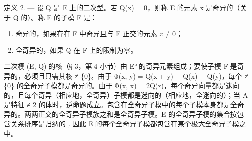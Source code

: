 定义 2. --- 设 Q 是 E 上的二次型。若 Q(x) = 0，则称 E 的元素 x 是奇异的（关于 Q 的）。称 E 的子模 F 是：

\begin{enumerate}
\def\labelenumi{\arabic{enumi})}
\item
  奇异的，如果存在 F 中奇异且与 F 正交的元素 \(x \neq 0\)；
\item
  全奇异的，如果 Q 在 F 上的限制为零。
\end{enumerate}

二次模 (E, Q) 的核（§ 3，第 4 小节）由 E° 的奇异元素组成；要使子模 F 是奇异的，必须且只需其核 ≠ \{0\}。由于 Φ(x, y) = Q(x + y) − Q(x) − Q(y)，每个 ≠ \{0\} 的全奇异子模都是奇异的。由于 Φ(x, x) = 2Q(x)，每个奇异向量都是迷向的，且每个奇异（相应地，全奇异）子模都是迷向的（相应地，全迷向的）；当 A 是特征 ≠ 2 的体时，逆命题成立。包含在全奇异子模中的每个子模本身都是全奇异的。两两正交的全奇异子模族之和是全奇异子模。E 的全奇异子模的集合按包含关系排序是归纳的；因此 E 的每个全奇异子模都包含在某个极大全奇异子模之中。

